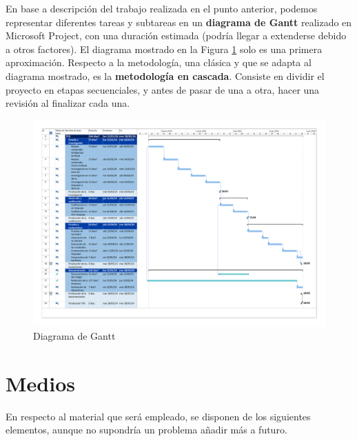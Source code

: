 \documentclass[12pt]{article}
\begin{document}
		En base a descripción del trabajo realizada en el punto anterior, podemos representar diferentes tareas y subtareas en un \textbf{diagrama de Gantt} realizado en Microsoft Project, con una duración estimada (podría llegar a extenderse debido a otros factores). El diagrama mostrado en la Figura \ref{fig:gantt} solo es una primera aproximación. Respecto a la metodología, una clásica y que se adapta al diagrama mostrado, es la \textbf{metodología en cascada}. Consiste en dividir el proyecto en etapas secuenciales, y antes de pasar de una a otra, hacer una revisión al finalizar cada una. 
		
		\begin{figure}[H]
			\centering
			\includegraphics[scale = 0.4]{gantt}
			\caption{Diagrama de Gantt}
			\label{fig:gantt}
		\end{figure}
	
	\section{Medios}
	
		En respecto al material que será empleado, se disponen de los siguientes elementos, aunque no supondría un problema añadir más a futuro. 
		
\end{document}
